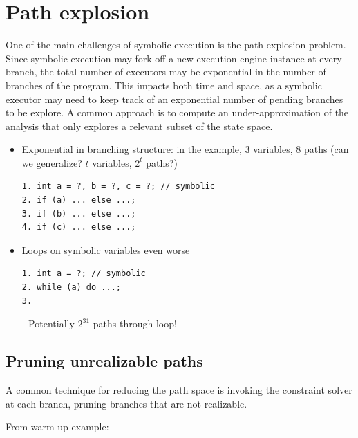 
\section{Path explosion}
\label{se:path-explosion}

One of the main challenges of symbolic execution is the path explosion problem. Since symbolic execution may fork off a new execution engine instance at every branch, the total number of executors may be exponential in the number of branches of the program. This impacts both time and space, as a symbolic executor may need to keep track of an exponential number of pending branches to be explore. A common approach is to compute an under-approximation of the analysis that only explores a relevant subset of the state space.

\begin{itemize}

\item Exponential in branching structure: in the example, 3 variables, 8 paths (can we generalize? $t$ variables, $2^t$ paths?)

\begin{verbatim}
1. int a = ?, b = ?, c = ?; // symbolic
2. if (a) ... else ...;
3. if (b) ... else ...;
4. if (c) ... else ...;
\end{verbatim}

\item Loops on symbolic variables even worse

\begin{verbatim}
1. int a = ?; // symbolic
2. while (a) do ...;
3.
\end{verbatim}
- Potentially $2^{31}$ paths through loop!

\end{itemize}

\subsection{Pruning unrealizable paths}
\label{ss:unrealizable-paths}

A common technique for reducing the path space is invoking the constraint solver at each branch, pruning branches that are not realizable. 

From warm-up example:

